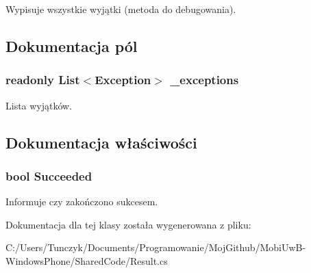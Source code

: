 Wypisuje wszystkie wyjątki (metoda do debugowania). 



\subsection{Dokumentacja pól}
\hypertarget{a00049_a85f31aae300868b246a14086e6eceb36}{}
\subsubsection[{\+\_\+exceptions}]{\setlength{\rightskip}{0pt plus 5cm}readonly List$<$Exception$>$ \+\_\+exceptions\hspace{0.3cm}{\ttfamily [private]}}\label{a00049_a85f31aae300868b246a14086e6eceb36}


Lista wyjątków. 



\subsection{Dokumentacja właściwości}
\hypertarget{a00049_a5e941e13889494ff5524fe02f0310523}{}
\subsubsection[{Succeeded}]{\setlength{\rightskip}{0pt plus 5cm}bool Succeeded\hspace{0.3cm}{\ttfamily [get]}}\label{a00049_a5e941e13889494ff5524fe02f0310523}


Informuje czy zakończono sukcesem. 



Dokumentacja dla tej klasy została wygenerowana z pliku\+:\begin{DoxyCompactItemize}
\item 
C\+:/\+Users/\+Tunczyk/\+Documents/\+Programowanie/\+Moj\+Github/\+Mobi\+Uw\+B-\/\+Windows\+Phone/\+Shared\+Code/Result.\+cs\end{DoxyCompactItemize}
